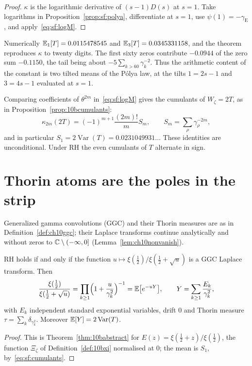 \begin{proof}
$\kappa$ is the logarithmic derivative of $(s-1)D(s)$ at $s=1$. Take logarithms in Proposition~\ref{prop:sf:polya}, differentiate at $s=1$, use $\psi(1)=-\gamma_{\mathrm E}$, and apply~\eqref{eq:sf:logM}.
\end{proof}

Numerically $\mathbb{E}_1[T]=0.0115478545$ and $\mathbb{E}_3[T]=0.0345331158$, and the theorem reproduces $\kappa$ to twenty digits. The first sixty zeros contribute $-0.0944$ of the zero sum $-0.1150$, the tail being about $-5\sum_{k>60}\gamma_k^{-2}$. Thus the arithmetic content of the constant is two tilted means of the P\'olya law, at the tilts $1=2s-1$ and $3=4s-1$ evaluated at $s=1$.

Comparing coefficients of $\theta^{2m}$ in~\eqref{eq:sf:logM} gives the cumulants of $W_\zeta=2T$, as in Proposition~\ref{prop:10bcumulants}:
\begin{equation}\label{eq:sf:cumulants}
\kappa_{2m}(2T)=(-1)^{m+1}\frac{(2m)!}{m}S_m,\qquad S_m=\sum_\rho\gamma_\rho^{-2m},
\end{equation}
and in particular $S_1=2\operatorname{Var}(T)=0.0231049931\ldots$ These identities are unconditional. Under RH the even cumulants of $T$ alternate in sign.

\section{Thorin atoms are the poles in the strip}\label{sec:sf:thorin}

Generalized gamma convolutions (GGC) and their Thorin measures are as in Definition~\ref{def:ch10ggc}; their Laplace transforms continue analytically and without zeros to $\mathbb{C}\setminus(-\infty,0]$ (Lemma~\ref{lem:ch10nonvanish}).

\begin{proposition}\label{prop:sf:thorin}
RH holds if and only if the function $u\mapsto\xi(\frac12)/\xi(\frac12+\sqrt u)$ is a GGC Laplace transform. Then
\[
\frac{\xi(\frac12)}{\xi(\frac12+\sqrt u)}=\prod_{k\ge1}\Bigl(1+\frac{u}{\gamma_k^2}\Bigr)^{-1}=\mathbb{E}\bigl[e^{-uY}\bigr],\qquad Y=\sum_{k\ge1}\frac{E_k}{\gamma_k^2},
\]
with $E_k$ independent standard exponential variables, drift $0$ and Thorin measure $\tau=\sum_k\delta_{\gamma_k^2}$. Moreover $\mathbb{E}[Y]=2\operatorname{Var}(T)$.
\end{proposition}

\begin{proof}
This is Theorem~\ref{thm:10babstract} for $E(z)=\xi(\frac12+z)/\xi(\frac12)$, the function $\Xi_\zeta$ of Definition~\ref{def:10bxi} normalised at $0$; the mean is $S_1$, by~\eqref{eq:sf:cumulants}.
\end{proof}

